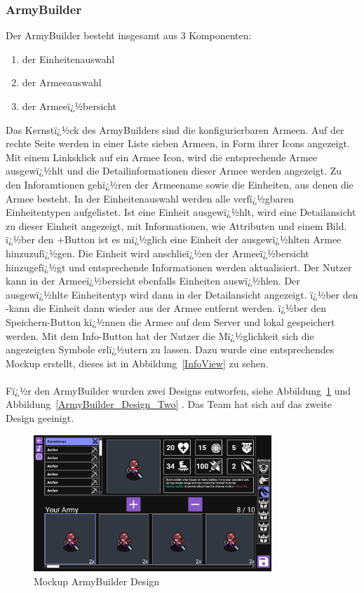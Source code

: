 \documentclass[12pt, titlepage]{scrartcl}
\newcommand{\RN}[1]{%
	\textup{\uppercase\expandafter{\romannumeral#1}}%
}
\newcommand{\Abb}[1]{%
	Abbildung\ \ref{#1}%
}
\begin{document}
		\subsubsection{ArmyBuilder}
			Der ArmyBuilder besteht insgesamt aus 3 Komponenten:
			\begin{enumerate}
				\item der Einheitenauswahl
				\item der Armeeauswahl
				\item der Armeeï¿½bersicht
			\end{enumerate}
		Das Kernstï¿½ck des ArmyBuilders sind die konfigurierbaren Armeen. Auf der rechte Seite werden in einer Liste sieben Armeen, in Form ihrer Icons angezeigt. Mit einem Linksklick auf ein Armee Icon, wird die entsprechende Armee ausgewï¿½hlt und die Detailinformationen dieser Armee werden angezeigt. Zu den Inforamtionen gehï¿½ren der Armeename sowie die Einheiten, aus denen die Armee besteht. In der Einheitenauswahl werden alle verfï¿½gbaren Einheitentypen aufgelistet. Ist eine Einheit ausgewï¿½hlt, wird eine Detailansicht zu dieser Einheit angezeigt, mit Informationen, wie Attributen und einem Bild. ï¿½ber den \glqq +\grqq Button ist es mï¿½glich eine Einheit der ausgewï¿½hlten Armee hinzuzufï¿½gen. Die Einheit wird anschlieï¿½en der Armeeï¿½bersicht hinzugefï¿½gt und entsprechende Informationen werden aktualisiert. Der Nutzer kann in der Armeeï¿½bersicht ebenfalls Einheiten auswï¿½hlen. Der ausgewï¿½hlte Einheitentyp wird dann in der Detailansicht angezeigt. ï¿½ber den \glqq -\grqq kann die Einheit dann wieder aus der Armee entfernt werden. ï¿½ber den \glqq Speichern\grqq-Button kï¿½nnen die Armee auf dem Server und lokal gespeichert werden. Mit dem \glqq Info\grqq-Button hat der Nutzer die Mï¿½glichkeit sich die angezeigten Symbole erlï¿½utern zu lassen. Dazu wurde eine entsprechendes Mockup erstellt, dieses ist in \Abb{InfoView} zu sehen.\\ \\ Fï¿½r den ArmyBuilder wurden zwei Designs entworfen, siehe \Abb{ArmyBuilder_Design_One} und \Abb{ArmyBuilder_Design_Two}. Das Team hat sich auf das zweite Design geeinigt. 
		\begin{figure}[H] 
			\centering
			\includegraphics[width=0.8\textwidth]{ArmyBuilder_Design_One.png}
			\caption{Mockup ArmyBuilder Design \RN{1} }
			\label{ArmyBuilder_Design_One}
		\end{figure}
\end{document}
